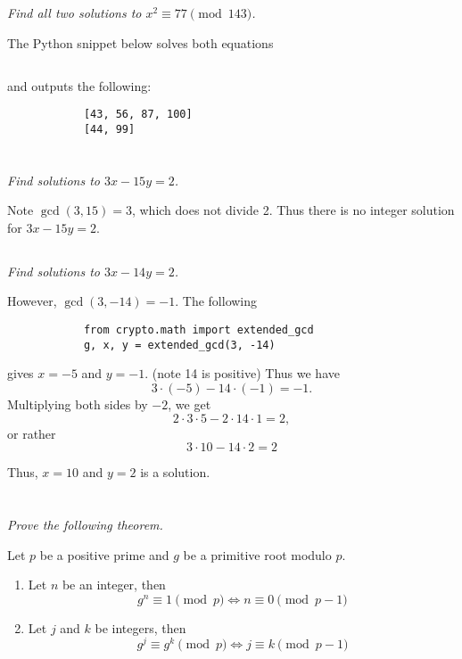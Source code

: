 \documentclass[12pt]{article}
\begin{document}
    \subsection{} \textit{Find all two solutions to $x^2 \equiv 77 \pmod{143}$.}

        The Python snippet below solves both equations

        \inputminted{python}{hw2_3.py}

        and outputs the following:

        \begin{verbatim}
            [43, 56, 87, 100]
            [44, 99]
        \end{verbatim}

\section{}
    \subsection{} \textit{Find solutions to $3x - 15y = 2$.}

        Note $\gcd(3, 15) = 3$, which does not divide 2. Thus there is no integer solution for $3x - 15y = 2$.
    \subsection{} \textit{Find solutions to $3x - 14y = 2$.}

        However, $\gcd(3, -14) = -1$. The following

        \begin{verbatim}
            from crypto.math import extended_gcd
            g, x, y = extended_gcd(3, -14)
        \end{verbatim}

        gives $x = -5$ and $y = -1$. (note 14 is positive) Thus we have $$3 \cdot (-5) - 14 \cdot (-1) = -1.$$ Multiplying both sides by $-2$, we get $$2 \cdot 3 \cdot 5 - 2 \cdot 14 \cdot 1 = 2,$$ or rather $$3 \cdot 10 - 14 \cdot 2 = 2$$

        Thus, $x = 10$ and $y = 2$ is a solution.

\section{} \textit{Prove the following theorem.}
    \begin{thm}
        Let $p$ be a positive prime and $g$ be a primitive root modulo $p$.
        \begin{enumerate}
            \item Let $n$ be an integer, then $$g^n \equiv 1 \pmod{p} \Longleftrightarrow n \equiv 0 \pmod{p - 1}$$

            \item Let $j$ and $k$ be integers, then $$g^j \equiv g^k \pmod{p} \Longleftrightarrow j \equiv k \pmod{p - 1}$$
        \end{enumerate}
    \end{thm}
\end{document}
